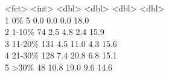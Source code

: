 \documentclass[11pt,oneside]{book}
\begin{document}
\begin{routput}
\hspace*{1em}\textless{}fct\textgreater{} \hspace*{2.5em}\textless{}int\textgreater{} \hspace*{1.2em}\textless{}dbl\textgreater{} \hspace*{1.5em}\textless{}dbl\textgreater{} \hspace*{1.5em}\textless{}dbl\textgreater{} \hspace*{1.5em}\textless{}dbl\textgreater{}\\
1 0\% \hspace*{4em}5 \hspace*{2.2em}0.0 \hspace*{2.5em}0.0 \hspace*{2.5em}0.0 \hspace*{2em}18.0\\
2 1-10\% \hspace*{2.5em}74 \hspace*{2.2em}2.5 \hspace*{2.5em}4.8 \hspace*{2.5em}2.4 \hspace*{2em}15.9\\
3 11-20\% \hspace*{1.8em}131 \hspace*{2.2em}4.5 \hspace*{2em}11.0 \hspace*{2.5em}4.3 \hspace*{2em}15.6\\
4 21-30\% \hspace*{1.8em}128 \hspace*{2.2em}7.4 \hspace*{2em}20.8 \hspace*{2.5em}6.8 \hspace*{2em}15.1\\
5 \textgreater{}30\% \hspace*{2.2em}48 \hspace*{1.8em}10.8 \hspace*{2em}19.0 \hspace*{2.5em}9.6 \hspace*{2em}14.6
\end{routput}
\end{document}
